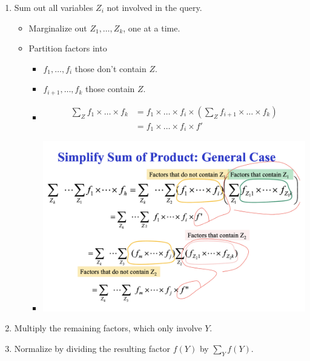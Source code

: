 \documentclass{article}
\begin{document}
\begin{itemize}
\begin{enumerate}
\begin{itemize}
                \end{itemize}
            \item Sum out all variables $Z_i$ not involved in the query.
                \begin{itemize}
                    \item Marginalize out $Z_1, \ldots, Z_k$, one at a time.
                    \item Partition factors into
                        \begin{itemize}
                            \item $f_1, \ldots, f_i$ those don't contain $Z$.
                            \item $f_{i+1}, \ldots, f_k$ those contain $Z$.
                            \item
                            \begin{align*}
                                \sum\limits_{Z} f_1 \times \dots \times f_k &= f_1 \times \dots \times f_i \times (\sum\limits_{Z} f_{i+1} \times \dots \times f_k) \\
                                &= f_1 \times \dots \times f_i \times f'
                            \end{align*}
                            \item \includegraphics[scale=0.35]{simplify_sum_of_product}
                        \end{itemize}
                \end{itemize}
            \item Multiply the remaining factors, which only involve $Y$.
            \item Normalize by dividing the resulting factor $f(Y)$ by $\sum\limits_{Y} f(Y)$.

\end{enumerate}
\end{itemize}
\end{document}
